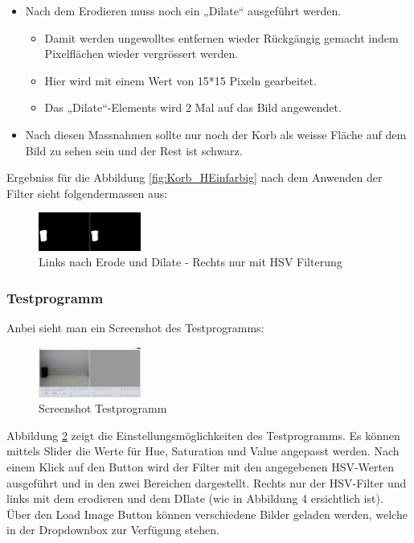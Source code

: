 \begin{itemize}
\begin{itemize}
    \end{itemize}
    \item Nach dem Erodieren muss noch ein „Dilate“ ausgeführt werden.
    \begin{itemize}
        \item Damit werden ungewolltes entfernen wieder Rückgängig gemacht 
            indem Pixelflächen wieder vergrössert werden.
        \item Hier wird mit einem Wert von 15*15 Pixeln gearbeitet.
        \item Das „Dilate“-Elements wird 2 Mal auf das Bild angewendet.
    \end{itemize}
    \item Nach diesen Massnahmen sollte nur noch der Korb als weisse Fläche 
        auf dem Bild zu sehen sein und der Rest ist schwarz.
\end{itemize}

Ergebniss für die Abbildung \ref{fig:Korb_HEinfarbig} nach dem Anwenden der 
Filter sieht folgendermassen aus:

\begin{figure}[h!]
	\centering
	\includegraphics[width=0.3\textwidth]{fig/Korberkennung1.png}
	\caption{Links nach Erode und Dilate - Rechts nur mit HSV Filterung}
	\label{fig:Korb_Erkennung}
\end{figure}

\subsubsection{Testprogramm}
Anbei sieht man ein Screenshot des Testprogramms:
\begin{figure}[h!]
    \centering
    \includegraphics[width=0.3\textwidth]{fig/Testprogramm.png}
    \caption{Screenshot Testprogramm}
    \label{fig:Korb_Testprogramm}
\end{figure}

Abbildung \ref{fig:Korb_Testprogramm} zeigt die Einstellungsmöglichkeiten des 
Testprogramms. Es können mittels Slider die Werte für Hue, Saturation und 
Value angepasst werden. Nach einem Klick auf den Button wird der Filter mit 
den angegebenen HSV-Werten ausgeführt und in den zwei Bereichen dargestellt. 
Rechts nur der HSV-Filter und links mit dem erodieren und dem DIlate (wie in 
Abbildung 4 ersichtlich ist). \\
Über den Load Image Button können verschiedene Bilder geladen werden, welche 
in der Dropdownbox zur Verfügung stehen.
